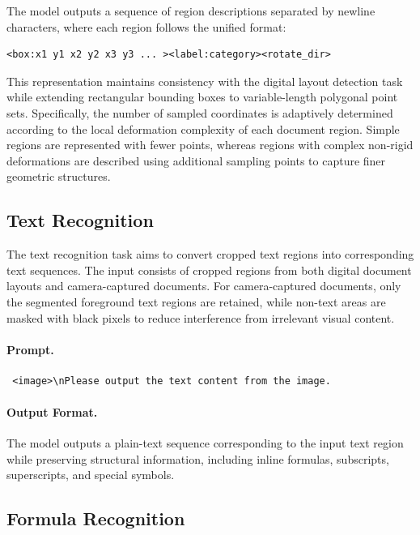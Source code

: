 \documentclass{fairmeta}
\begin{document}
The model outputs a sequence of region descriptions separated by newline characters, where each region follows the unified format:

\begin{verbatim}
<box:x1 y1 x2 y2 x3 y3 ... ><label:category><rotate_dir>
\end{verbatim}

This representation maintains consistency with the digital layout detection task while extending rectangular bounding boxes to variable-length polygonal point sets. Specifically, the number of sampled coordinates is adaptively determined according to the local deformation complexity of each document region. Simple regions are represented with fewer points, whereas regions with complex non-rigid deformations are described using additional sampling points to capture finer geometric structures.

\subsection{Text Recognition}
\label{app:text_recognition}

The text recognition task aims to convert cropped text regions into corresponding text sequences. The input consists of cropped regions from both digital document layouts and camera-captured documents. For camera-captured documents, only the segmented foreground text regions are retained, while non-text areas are masked with black pixels to reduce interference from irrelevant visual content.

\paragraph{Prompt.}
\begin{verbatim} <image>\nPlease output the text content from the image.
\end{verbatim}

\paragraph{Output Format.}

The model outputs a plain-text sequence corresponding to the input text region while preserving structural information, including inline formulas, subscripts, superscripts, and special symbols.



\subsection{Formula Recognition}
\label{app:formula_recognition}
\end{document}
